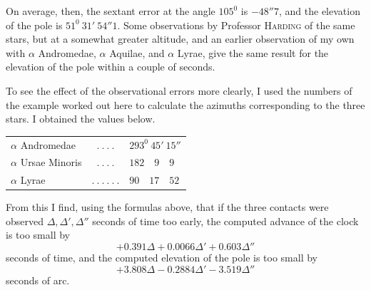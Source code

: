 On average, then, the sextant error at the angle $105^0$ is $-48''7$, and the elevation of the pole is $51^0\ 31'\ 54''1$. Some observations by Professor \textsc{Harding}
%
of the same stars, but at a somewhat greater altitude, and an earlier observation of my own with $\alpha$ Andromedae, $\alpha$ Aquilae, and $\alpha$ Lyrae, give the same result for the elevation of the pole within a couple of seconds.

To see the effect of the observational errors more clearly, I used the numbers of the example worked out here to calculate the azimuths corresponding to the three stars. I obtained the values below.
\begin{center}
\begin{tabular}{lcl}
$\alpha$ Andromedae & $.\ .\ .\ .$ & $293^{0}\ 45'\ 15''$\\
$\alpha$ Ursae Minoris & $.\ .\ .\ .$ & $182\quad9\quad9$\\
$\alpha$ Lyrae & $.\ .\ .\ .\ .\ .$ & $90\quad17\quad52$
\end{tabular}
\end{center}
From this I find, using the formulas above, that if the three contacts were observed $\Delta,\Delta',\Delta''$ seconds of time too early, the computed advance of the clock is too small by
\[
+0.391\Delta+0.0066\Delta'+0.603\Delta''
\]
seconds of time, and the computed elevation of the pole is too small by
\[
+3.808\Delta-0.2884\Delta'-3.519\Delta''
\]
seconds of arc.


